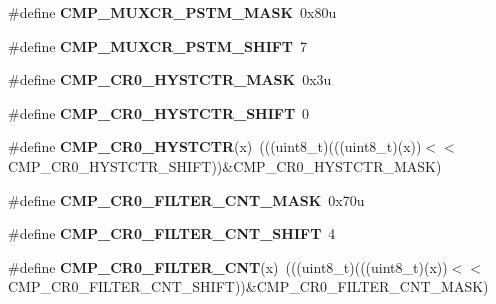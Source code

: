 \begin{DoxyCompactItemize}
\item 
\#define {\bfseries C\+M\+P\+\_\+\+M\+U\+X\+C\+R\+\_\+\+P\+S\+T\+M\+\_\+\+M\+A\+SK}~0x80u\hypertarget{group__CMP__Register__Masks_ga5636686e652e5c89b119ff1954c0e98a}{}\label{group__CMP__Register__Masks_ga5636686e652e5c89b119ff1954c0e98a}

\item 
\#define {\bfseries C\+M\+P\+\_\+\+M\+U\+X\+C\+R\+\_\+\+P\+S\+T\+M\+\_\+\+S\+H\+I\+FT}~7\hypertarget{group__CMP__Register__Masks_gafd77773e4a14b8f22b0b00c52a180d0c}{}\label{group__CMP__Register__Masks_gafd77773e4a14b8f22b0b00c52a180d0c}

\item 
\#define {\bfseries C\+M\+P\+\_\+\+C\+R0\+\_\+\+H\+Y\+S\+T\+C\+T\+R\+\_\+\+M\+A\+SK}~0x3u\hypertarget{group__CMP__Register__Masks_ga9a81a95d8ceda15abb107f3c961e2f03}{}\label{group__CMP__Register__Masks_ga9a81a95d8ceda15abb107f3c961e2f03}

\item 
\#define {\bfseries C\+M\+P\+\_\+\+C\+R0\+\_\+\+H\+Y\+S\+T\+C\+T\+R\+\_\+\+S\+H\+I\+FT}~0\hypertarget{group__CMP__Register__Masks_ga12a965eae39b79d9e6066de9af418df3}{}\label{group__CMP__Register__Masks_ga12a965eae39b79d9e6066de9af418df3}

\item 
\#define {\bfseries C\+M\+P\+\_\+\+C\+R0\+\_\+\+H\+Y\+S\+T\+C\+TR}(x)~(((uint8\+\_\+t)(((uint8\+\_\+t)(x))$<$$<$C\+M\+P\+\_\+\+C\+R0\+\_\+\+H\+Y\+S\+T\+C\+T\+R\+\_\+\+S\+H\+I\+FT))\&C\+M\+P\+\_\+\+C\+R0\+\_\+\+H\+Y\+S\+T\+C\+T\+R\+\_\+\+M\+A\+SK)\hypertarget{group__CMP__Register__Masks_ga78eaf28aa2956818501310daaeffca74}{}\label{group__CMP__Register__Masks_ga78eaf28aa2956818501310daaeffca74}

\item 
\#define {\bfseries C\+M\+P\+\_\+\+C\+R0\+\_\+\+F\+I\+L\+T\+E\+R\+\_\+\+C\+N\+T\+\_\+\+M\+A\+SK}~0x70u\hypertarget{group__CMP__Register__Masks_gab1e98c122818fe880217f72fab932ac2}{}\label{group__CMP__Register__Masks_gab1e98c122818fe880217f72fab932ac2}

\item 
\#define {\bfseries C\+M\+P\+\_\+\+C\+R0\+\_\+\+F\+I\+L\+T\+E\+R\+\_\+\+C\+N\+T\+\_\+\+S\+H\+I\+FT}~4\hypertarget{group__CMP__Register__Masks_ga07a4d57ab7d44b55b3d73f612aa7dd98}{}\label{group__CMP__Register__Masks_ga07a4d57ab7d44b55b3d73f612aa7dd98}

\item 
\#define {\bfseries C\+M\+P\+\_\+\+C\+R0\+\_\+\+F\+I\+L\+T\+E\+R\+\_\+\+C\+NT}(x)~(((uint8\+\_\+t)(((uint8\+\_\+t)(x))$<$$<$C\+M\+P\+\_\+\+C\+R0\+\_\+\+F\+I\+L\+T\+E\+R\+\_\+\+C\+N\+T\+\_\+\+S\+H\+I\+FT))\&C\+M\+P\+\_\+\+C\+R0\+\_\+\+F\+I\+L\+T\+E\+R\+\_\+\+C\+N\+T\+\_\+\+M\+A\+SK)\hypertarget{group__CMP__Register__Masks_ga1f6d81f303672acd661263de6da7ea13}{}\label{group__CMP__Register__Masks_ga1f6d81f303672acd661263de6da7ea13}


\end{DoxyCompactItemize}
